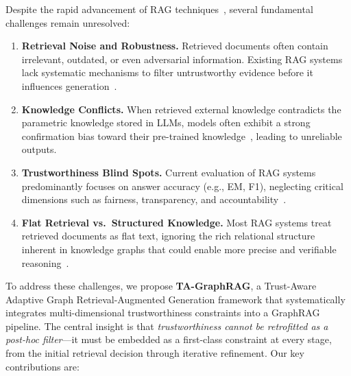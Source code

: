 \documentclass[11pt,a4paper]{article}
\begin{document}
Despite the rapid advancement of RAG techniques~\cite{gao2024retrieval,zhao2024retrieval}, several fundamental challenges remain unresolved:

\begin{enumerate}[leftmargin=*]
    \item \textbf{Retrieval Noise and Robustness.} Retrieved documents often contain irrelevant, outdated, or even adversarial information. Existing RAG systems lack systematic mechanisms to filter untrustworthy evidence before it influences generation~\cite{peng2024graphrag}.

    \item \textbf{Knowledge Conflicts.} When retrieved external knowledge contradicts the parametric knowledge stored in LLMs, models often exhibit a strong confirmation bias toward their pre-trained knowledge~\cite{longpre2021entity}, leading to unreliable outputs.

    \item \textbf{Trustworthiness Blind Spots.} Current evaluation of RAG systems predominantly focuses on answer accuracy (e.g., EM, F1), neglecting critical dimensions such as fairness, transparency, and accountability~\cite{zhou2024trustworthiness}.

    \item \textbf{Flat Retrieval vs.\ Structured Knowledge.} Most RAG systems treat retrieved documents as flat text, ignoring the rich relational structure inherent in knowledge graphs that could enable more precise and verifiable reasoning~\cite{peng2024graphrag}.
\end{enumerate}

To address these challenges, we propose \textbf{TA-GraphRAG}, a Trust-Aware Adaptive Graph Retrieval-Augmented Generation framework that systematically integrates multi-dimensional trustworthiness constraints into a GraphRAG pipeline. The central insight is that \emph{trustworthiness cannot be retrofitted as a post-hoc filter}---it must be embedded as a first-class constraint at every stage, from the initial retrieval decision through iterative refinement. Our key contributions are:
\end{document}
